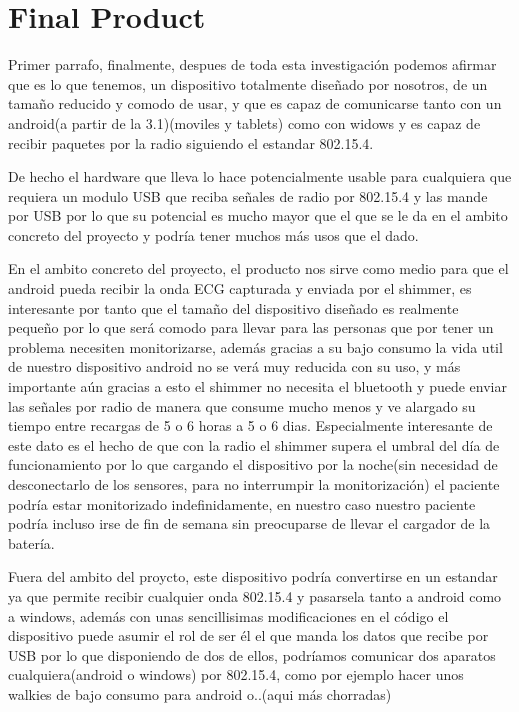 		\section{Final Product}
		\label{sec:hw-final}


		Primer parrafo, finalmente, despues de toda esta investigación podemos afirmar que es lo que tenemos, un dispositivo totalmente diseñado por nosotros, de un tamaño reducido y comodo de usar, y que es capaz de comunicarse tanto con un android(a partir de la 3.1)(moviles y tablets) como con widows y es capaz de recibir paquetes por la radio siguiendo el estandar 802.15.4. 

		De hecho el hardware que lleva lo hace potencialmente usable para cualquiera que requiera un modulo USB que reciba señales de radio por 802.15.4 y las mande por USB por lo que su potencial es mucho mayor que el que se le da en el ambito concreto del proyecto y podría tener muchos más usos que el dado.

		En el ambito concreto del proyecto, el producto nos sirve como medio para que el android pueda recibir la onda ECG capturada y enviada por el shimmer, es interesante por tanto que el tamaño del dispositivo diseñado es realmente pequeño por lo que será comodo para llevar para las personas que por tener un problema necesiten monitorizarse, además gracias a su bajo consumo la vida util de nuestro dispositivo android no se verá muy reducida con su uso, y más importante aún  gracias a esto el shimmer no necesita el bluetooth y puede enviar las señales por radio de manera que consume mucho menos y ve alargado su tiempo entre recargas de 5 o 6 horas a 5 o 6 dias. Especialmente interesante de este dato es el hecho de que con la radio el shimmer supera el umbral del día de funcionamiento por lo que cargando el dispositivo por la noche(sin necesidad de desconectarlo de los sensores, para no interrumpir la monitorización) el paciente podría estar monitorizado indefinidamente, en nuestro caso nuestro paciente podría incluso irse de fin de semana sin preocuparse de llevar el cargador de la batería.

		Fuera del ambito del proycto, este dispositivo podría convertirse en un estandar ya que permite recibir cualquier onda 802.15.4 y pasarsela tanto a android como a windows, además con unas sencillisimas modificaciones en el código el dispositivo puede asumir el rol de ser él el que manda los datos que recibe por USB por lo que disponiendo de dos de ellos, podríamos comunicar dos aparatos cualquiera(android o windows) por 802.15.4, como por ejemplo hacer unos walkies de bajo consumo para android o..(aqui más chorradas)

